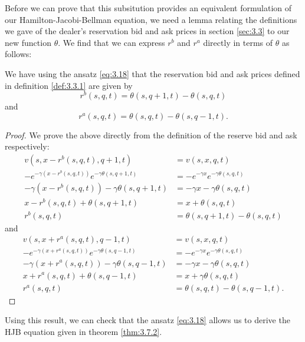 Before we can prove that this subsitution provides an equivalent formulation of our
Hamilton-Jacobi-Bellman equation, we need a lemma relating the definitions we gave
of the dealer's reservation bid and ask prices in section \ref{sec:3.3} to our new
function $\theta$. We find that we can express $r^b$ and $r^a$ directly in terms of 
$\theta$ as follows:
\begin{lemma}\label{lem:3.7.3}
    We have using the ansatz \eqref{eq:3.18} that the reservation bid and ask prices
    defined in definition \ref{def:3.3.1} are given by
    \begin{equation}
        r^b(s,q,t)=\theta(s,q+1,t)-\theta(s,q,t)
    \end{equation}
    and
    \begin{equation}
        r^a(s,q,t)=\theta(s,q,t)-\theta(s,q-1,t).
    \end{equation}
\end{lemma}
\begin{proof}
    We prove the above directly from the definition of the reserve bid and ask 
    respectively:
    \begin{align*}
        v(s,x-r^b(s,q,t),q+1,t)&=v(s,x,q,t)\\
        -e^{-\gamma(x-r^b(s,q,t))}e^{-\gamma\theta(s,q+1,t)}&=-e^{-\gamma x}e^{-\gamma\theta(s,q,t)}\\
        -\gamma(x-r^b(s,q,t))-\gamma\theta(s,q+1,t)&=-\gamma x-\gamma\theta(s,q,t)\\
        x-r^b(s,q,t)+\theta(s,q+1,t)&=x+\theta(s,q,t)\\
        r^b(s,q,t)&=\theta(s,q+1,t)-\theta(s,q,t)
    \end{align*}
    and
    \begin{align*}
        v(s,x+r^a(s,q,t),q-1,t)&=v(s,x,q,t)\\
        -e^{-\gamma(x+r^a(s,q,t))}e^{-\gamma\theta(s,q-1,t)}&=-e^{-\gamma x}e^{-\gamma\theta(s,q,t)}\\
        -\gamma(x+r^a(s,q,t))-\gamma\theta(s,q-1,t)&=-\gamma x-\gamma\theta(s,q,t)\\
        x+r^a(s,q,t)+\theta(s,q-1,t)&=x+\gamma\theta(s,q,t)\\
        r^a(s,q,t)&=\theta(s,q,t)-\theta(s,q-1,t).
    \end{align*}
\end{proof}

Using this result, we can check that the ansatz \eqref{eq:3.18} allows us to derive 
the HJB equation given in theorem \ref{thm:3.7.2}.

